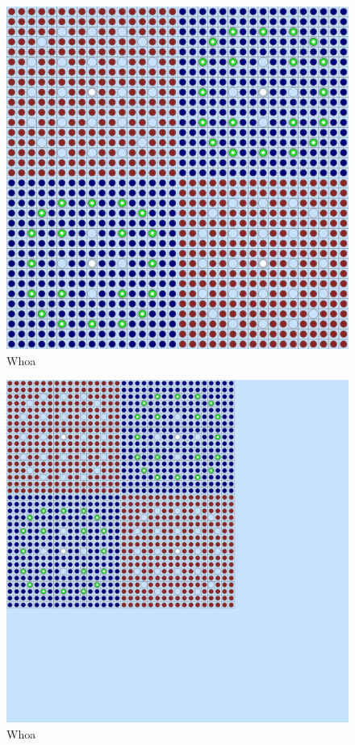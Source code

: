 \begin{figure}[h!]
  \centering
  \includegraphics[width=0.65\linewidth]{figures/benchmarks/2x2}
\caption[A 2$\times$2 colorset of BEAVRS assemblies]{Whoa}
\label{fig:chap7-2x2}
\end{figure}

\begin{figure}[h!]
  \centering
  \includegraphics[width=0.65\linewidth]{figures/benchmarks/reflector}
\caption[A reflected 2$\times$2 colorset of BEAVRS assemblies]{Whoa}
\label{fig:chap7-reflector}
\end{figure}

